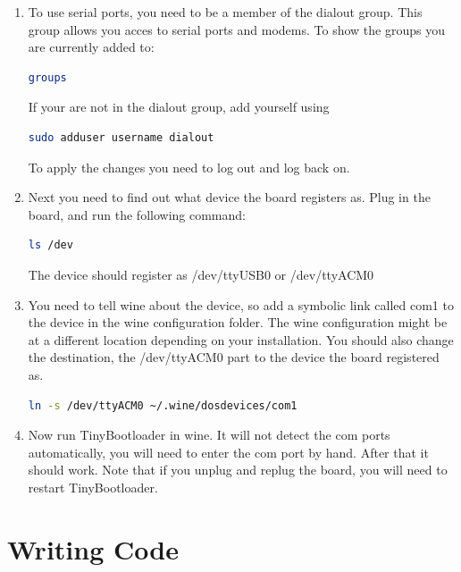 \documentclass{article}
\begin{document}
\begin{enumerate}
  \item To use serial ports, you need to be a member of the dialout group. This group allows you acces to serial ports and modems. To show the groups you are currently added to:

\begin{lstlisting}[language=bash,frame=single]
groups
\end{lstlisting}

If your are not in the dialout group, add yourself using

\begin{lstlisting}[language=bash,frame=single]
sudo adduser username dialout
\end{lstlisting}

To apply the changes you need to log out and log back on.

\item Next you need to find out what device the board registers as. Plug in the board, and run the following command:

\begin{lstlisting}[language=bash,frame=single]
ls /dev
\end{lstlisting}

The device should register as /dev/ttyUSB0 or /dev/ttyACM0

\item You need to tell wine about the device, so add a symbolic link called com1 to the device in the wine configuration folder. The wine configuration might be at a different location depending on your installation. You should also change the destination, the /dev/ttyACM0 part to the device the board registered as.

\begin{lstlisting}[language=bash,frame=single]
ln -s /dev/ttyACM0 ~/.wine/dosdevices/com1 
\end{lstlisting}

\item Now run TinyBootloader in wine. It will not detect the com ports automatically, you will need to enter the com port by hand. After that it should work. Note that if you unplug and replug the board, you will need to restart TinyBootloader.
\end{enumerate}

\section{Writing Code}
\end{document}
